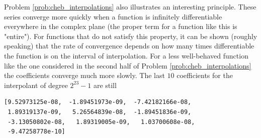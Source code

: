 Problem \ref{prob:cheb_interpolations} also illustrates an interesting principle.
These series converge more quickly when a function is infinitely differentiable everywhere in the complex plane (the proper term for a function like this is "entire").
For functions that do not satisfy this property, it can be shown (roughly speaking) that the rate of convergence depends on how many times differentiable the function is on the interval of interpolation.
For a less well-behaved function like the one considered in the second half of Problem \ref{prob:cheb_interpolations} the coefficients converge much more slowly.
The last $10$ coefficients for the interpolant of degree $2^{23} - 1$ are still
\begin{lstlisting}
[9.52973125e-08,  -1.89451973e-09,  -7.42182166e-08,
 1.89319137e-09,   5.26564839e-08,  -1.89451836e-09,
 -3.13050802e-08,   1.89319005e-09,   1.03700608e-08,
 -9.47258778e-10]
\end{lstlisting}

